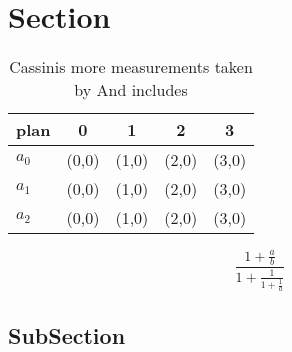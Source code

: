 \documentclass[a4paper]{article}
\begin{document}
\section{Section}

\begin{table}
\begin{adjustbox}{width=0.6\columnwidth}
\begin{tabular}{|l|l|l|l|l|}
\hline
\textbf{plan} & \multicolumn{1}{c|}{\textbf{0}} & \multicolumn{1}{c|}{\textbf{1}} & \multicolumn{1}{c|}{\textbf{2}} & \multicolumn{1}{c|}{\textbf{3}} \\ \hline
\textbf{$a_0$}  & (0,0) & (1,0) & (2,0) & (3,0) \\ \hline
\textbf{$a_1$}  & (0,0) & (1,0) & (2,0) & (3,0) \\ \hline
\textbf{$a_2$}  & (0,0) & (1,0) & (2,0) & (3,0) \\ \hline
\end{tabular}
\end{adjustbox}
\caption{Cassinis more measurements taken by And includes 
}
\end{table}

\[ \frac{1+\frac{a}{b}}{1+\frac{1}{1+\frac{1}{a}}} \]

\subsection{SubSection}
\end{document}
